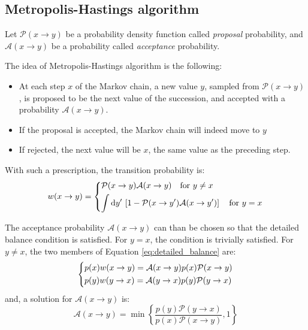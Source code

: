 \subsection*{Metropolis-Hastings algorithm}
Let $\mathcal P(x\to y)$ be a probability density function called \emph{proposal} probability,
and $\mathcal A(x\to y)$ be a probability called \emph{acceptance} probability.

The idea of Metropolis-Hastings algorithm is the following:
\begin{itemize}
    \item At each step $x$ of the Markov chain, a new value $y$, sampled from $\mathcal P(x\to y)$,
        is proposed to be the next value of the succession, and accepted with a probability $\mathcal A(x\to y)$.
    \item If the proposal is accepted, the Markov chain will indeed move to $y$
    \item If rejected, the next value will be $x$, \ie the same value as the preceding step.
\end{itemize}

With such a prescription, the transition probability is:
\begin{equation}\label{eq:metropolis_transition}
    w(x\to y) = 
    \begin{dcases}
        \mathcal P(x\to y)\mathcal A(x\to y) \quad \mathrm{for}\ y \neq x \\
        \int\mathrm dy'\,\left[1 - \mathcal P(x\to y')\mathcal A(x\to y')\right] \quad \mathrm{for}\ y=x
    \end{dcases}
\end{equation}

The acceptance probability $\mathcal A(x\to y)$ can than be chosen so that the detailed balance condition is satisfied.
For $y=x$, the condition is trivially satisfied. 
For $y\neq x$, the two members of Equation \eqref{eq:detailed_balance} are:
\[
    \begin{dcases}
        p(x)w(x\to y) = \mathcal A(x\to y)p(x)\mathcal P(x\to y) \\
        p(y)w(y\to x) = \mathcal A(y\to x)p(y)\mathcal P(y\to x)
    \end{dcases}
\]
and, a solution for $\mathcal A(x\to y)$ is:
\begin{equation}\label{eq:acceptance}
    \mathcal A(x\to y) = \min\left\{\frac{p(y)\mathcal P(y\to x)}{p(x)\mathcal P(x\to y)},1\right\}
\end{equation}


